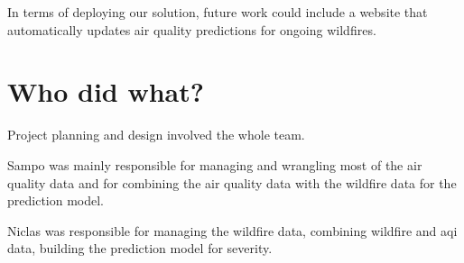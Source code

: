 \documentclass[a4paper,12pt]{article}
\begin{document}
In terms of deploying our solution, future work could include a website that automatically updates air quality predictions for ongoing wildfires.

\section{Who did what?}

Project planning and design involved the whole team.

Sampo was mainly responsible for managing and wrangling most of the air quality data and for combining the air quality data with the wildfire data for the prediction model.

Niclas was responsible for managing the wildfire data, combining wildfire and aqi data, building the prediction model for severity.

\nocite{*}
\printbibliography[title={Bibliography},heading=bibliography]
\end{document}
